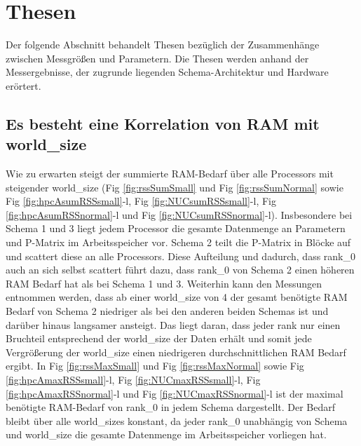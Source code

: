 \section{Thesen}
\label{sec:thesen}

Der folgende Abschnitt behandelt Thesen bezüglich der Zusammenhänge zwischen Messgrößen und Parametern.
Die Thesen werden anhand der Messergebnisse, der zugrunde liegenden Schema-Architektur und Hardware erörtert.

\subsection{Es besteht eine Korrelation von RAM mit world\_size}

Wie zu erwarten steigt der summierte RAM-Bedarf über alle Processors mit steigender world\_size
(Fig \ref{fig:rssSumSmall} und Fig \ref{fig:rssSumNormal} sowie Fig \ref{fig:hpcAsumRSSsmall}-l, Fig \ref{fig:NUCsumRSSsmall}-l, Fig \ref{fig:hpcAsumRSSnormal}-l und Fig \ref{fig:NUCsumRSSnormal}-l).
Insbesondere bei Schema 1 und 3 liegt jedem Processor
die gesamte Datenmenge an Parametern und P-Matrix im Arbeitsspeicher vor.
Schema 2 teilt die P-Matrix in Blöcke auf und scattert diese an alle Processors.
Diese Aufteilung und dadurch, dass rank\_0 auch an sich selbst
scattert führt dazu, dass rank\_0 von Schema 2 einen höheren RAM Bedarf hat als bei Schema 1 und 3.
Weiterhin kann den Messungen entnommen werden,
dass ab einer world\_size von 4 der gesamt benötigte RAM Bedarf von Schema 2 niedriger als bei den anderen beiden Schemas ist und darüber
hinaus langsamer ansteigt.
Das liegt daran, dass jeder rank nur einen Bruchteil entsprechend der world\_size der Daten erhält und somit jede Vergrößerung der
world\_size einen niedrigeren durchschnittlichen RAM Bedarf ergibt.
In Fig \ref{fig:rssMaxSmall} und Fig \ref{fig:rssMaxNormal} sowie Fig \ref{fig:hpcAmaxRSSsmall}-l, Fig \ref{fig:NUCmaxRSSsmall}-l, Fig \ref{fig:hpcAmaxRSSnormal}-l und Fig \ref{fig:NUCmaxRSSnormal}-l
ist der maximal benötigte RAM-Bedarf von rank\_0 in jedem Schema dargestellt.
Der Bedarf bleibt über alle world\_sizes konstant, da jeder rank\_0
unabhängig von Schema und world\_size die gesamte Datenmenge im Arbeitsspeicher vorliegen hat.

